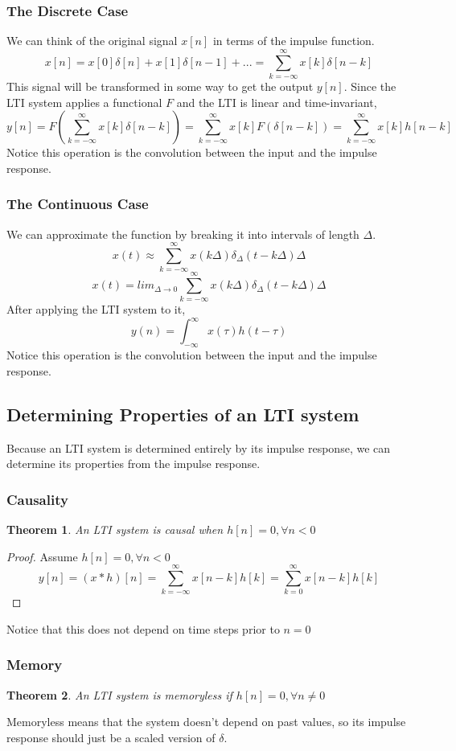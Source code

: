 \documentclass{article}
\newtheorem{theorem}{Theorem}
\newtheorem{proof}{Proof}
\begin{document}
\subsubsection{The Discrete Case}
We can think of the original signal $x[n]$ in terms of the impulse function.
$$x[n] = x[0]\delta[n]+x[1]\delta[n-1]+... = \sum_{k=-\infty}^{\infty}{x[k]\delta[n-k]}$$
This signal will be transformed in some way to get the output $y[n]$.
Since the LTI system applies a functional $F$ and the LTI is linear and time-invariant,
$$y[n] = F(\sum_{k=-\infty}^{\infty}{x[k]\delta[n-k]}) = \sum_{k=-\infty}^{\infty}{x[k]F(\delta[n-k])} = \sum_{k=-\infty}^{\infty}{x[k]h[n-k]}$$
Notice this operation is the convolution between the input and the impulse response.
\subsubsection{The Continuous Case}
We can approximate the function by breaking it into intervals of length $\Delta$.
$$x(t) \approx \sum_{k=-\infty}^{\infty}{x(k\Delta)\delta_{\Delta}(t-k\Delta)\Delta}$$
$$x(t) = lim_{\Delta \rightarrow 0}\sum_{k=-\infty}^{\infty}{x(k\Delta)\delta_{\Delta}(t-k\Delta)\Delta}$$
After applying the LTI system to it,
$$y(n) = \int_{-\infty}^{\infty}{x(\tau)h(t-\tau)}$$
Notice this operation is the convolution between the input and the impulse response.
\subsection{Determining Properties of an LTI system}
Because an LTI system is determined entirely by its impulse response, we can determine its properties from the impulse response.
\subsubsection{Causality}
\begin{theorem}
    An LTI system is causal when $h[n] = 0, \forall n < 0$
\end{theorem}
\begin{proof}
Assume $h[n] = 0, \forall n < 0$
$$y[n] = (x*h)[n] = \sum_{k=-\infty}^{\infty}{x[n-k]h[k]}=\sum_{k=0}^{\infty}{x[n-k]h[k]}$$
\end{proof}
Notice that this does not depend on time steps prior to $n=0$
\subsubsection{Memory}
\begin{theorem}
    An LTI system is memoryless if $h[n]=0, \forall n \ne 0$
\end{theorem}
Memoryless means that the system doesn't depend on past values, so its impulse response should
just be a scaled version of $\delta$.
\end{document}

